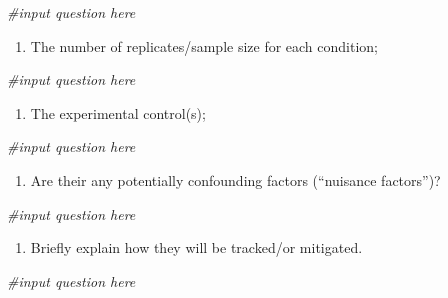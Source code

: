 \documentclass[
]{book}
\newenvironment{Shaded}{\begin{snugshade}}{\end{snugshade}}
\newcommand{\CommentTok}[1]{\textcolor[rgb]{0.56,0.35,0.01}{\textit{#1}}}
\providecommand{\tightlist}{%
  \setlength{\itemsep}{0pt}\setlength{\parskip}{0pt}}
\begin{document}
\begin{Shaded}
\begin{Highlighting}[]
\CommentTok{\#input question here}
\end{Highlighting}
\end{Shaded}

\begin{enumerate}
\def\labelenumi{\arabic{enumi})}
\setcounter{enumi}{3}
\tightlist
\item
  The number of replicates/sample size for each condition;
\end{enumerate}

\begin{Shaded}
\begin{Highlighting}[]
\CommentTok{\#input question here}
\end{Highlighting}
\end{Shaded}

\begin{enumerate}
\def\labelenumi{\arabic{enumi})}
\setcounter{enumi}{4}
\tightlist
\item
  The experimental control(s);
\end{enumerate}

\begin{Shaded}
\begin{Highlighting}[]
\CommentTok{\#input question here}
\end{Highlighting}
\end{Shaded}

\begin{enumerate}
\def\labelenumi{\arabic{enumi})}
\setcounter{enumi}{5}
\tightlist
\item
  Are their any potentially confounding factors (``nuisance factors'')?
\end{enumerate}

\begin{Shaded}
\begin{Highlighting}[]
\CommentTok{\#input question here}
\end{Highlighting}
\end{Shaded}

\begin{enumerate}
\def\labelenumi{\arabic{enumi})}
\setcounter{enumi}{6}
\tightlist
\item
  Briefly explain how they will be tracked/or mitigated.
\end{enumerate}

\begin{Shaded}
\begin{Highlighting}[]
\CommentTok{\#input question here}
\end{Highlighting}
\end{Shaded}
\end{document}
